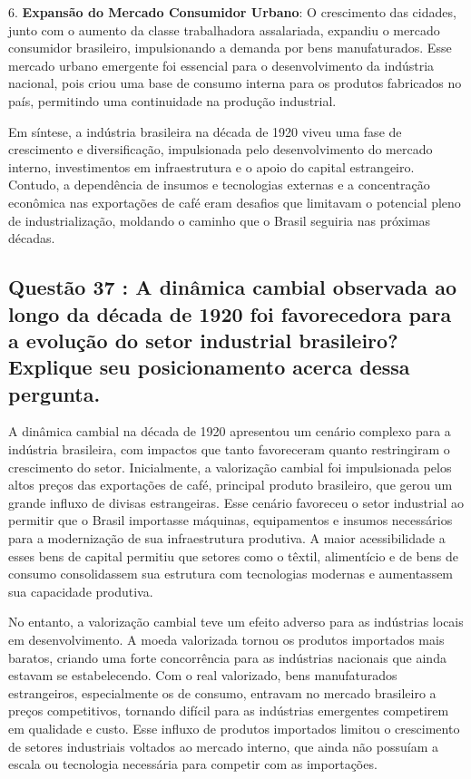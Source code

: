 \documentclass[a4paper,12pt]{article}[abntex2]
\begin{document}
6. \textbf{Expansão do Mercado Consumidor Urbano}: O crescimento das cidades, junto com o aumento da classe trabalhadora assalariada, expandiu o mercado consumidor brasileiro, impulsionando a demanda por bens manufaturados. Esse mercado urbano emergente foi essencial para o desenvolvimento da indústria nacional, pois criou uma base de consumo interna para os produtos fabricados no país, permitindo uma continuidade na produção industrial.

Em síntese, a indústria brasileira na década de 1920 viveu uma fase de crescimento e diversificação, impulsionada pelo desenvolvimento do mercado interno, investimentos em infraestrutura e o apoio do capital estrangeiro. Contudo, a dependência de insumos e tecnologias externas e a concentração econômica nas exportações de café eram desafios que limitavam o potencial pleno de industrialização, moldando o caminho que o Brasil seguiria nas próximas décadas.

\subsection{\textbf{Questão 37 : A dinâmica cambial observada ao longo da década de 1920 foi favorecedora para a evolução do setor industrial brasileiro? Explique seu posicionamento acerca dessa pergunta.}}

A dinâmica cambial na década de 1920 apresentou um cenário complexo para a indústria brasileira, com impactos que tanto favoreceram quanto restringiram o crescimento do setor. Inicialmente, a valorização cambial foi impulsionada pelos altos preços das exportações de café, principal produto brasileiro, que gerou um grande influxo de divisas estrangeiras. Esse cenário favoreceu o setor industrial ao permitir que o Brasil importasse máquinas, equipamentos e insumos necessários para a modernização de sua infraestrutura produtiva. A maior acessibilidade a esses bens de capital permitiu que setores como o têxtil, alimentício e de bens de consumo consolidassem sua estrutura com tecnologias modernas e aumentassem sua capacidade produtiva.

No entanto, a valorização cambial teve um efeito adverso para as indústrias locais em desenvolvimento. A moeda valorizada tornou os produtos importados mais baratos, criando uma forte concorrência para as indústrias nacionais que ainda estavam se estabelecendo. Com o real valorizado, bens manufaturados estrangeiros, especialmente os de consumo, entravam no mercado brasileiro a preços competitivos, tornando difícil para as indústrias emergentes competirem em qualidade e custo. Esse influxo de produtos importados limitou o crescimento de setores industriais voltados ao mercado interno, que ainda não possuíam a escala ou tecnologia necessária para competir com as importações.
\end{document}
